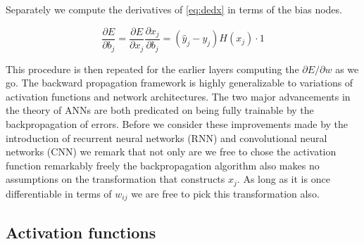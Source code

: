\noindent Separately we compute the derivatives of \ref{eq:dedx} in terms of the bias nodes.

\begin{equation}
\frac{\partial E}{\partial b_j} = \frac{\partial E}{\partial x_j} \frac{\partial x_j}{\partial b_j} =   (\hat{y}_{j} - y_{j}) H(x_j) \cdot 1
\end{equation}

\noindent This procedure is then repeated for the earlier layers computing the $
\partial E / \partial w $ as we go. The backward propagation framework is highly generalizable to variations of activation functions and network architectures. The two major advancements in the theory of ANNs are both predicated on being fully trainable by the backpropagation of errors. Before we consider these improvements made by the introduction of recurrent neural networks (RNN) and convolutional neural networks (CNN) we remark that not only are we free to chose the activation function remarkably freely the backpropagation algorithm also makes no assumptions on the transformation that constructs $x_j$. As long as it is once differentiable in terms of $w_{ij}$ we are free to pick this transformation also. 

\subsection{Activation functions}\label{sec:activation}